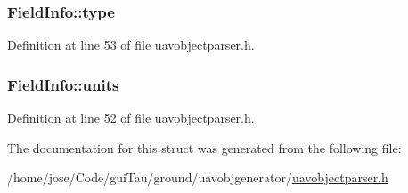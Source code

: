 \hypertarget{struct_field_info_a4bdab922a850f6d0f19057252fd2e71e}{
\subsubsection[{type}]{ Field\-Info\-::type}}\label{struct_field_info_a4bdab922a850f6d0f19057252fd2e71e}


Definition at line 53 of file uavobjectparser.\-h.

\hypertarget{struct_field_info_affe71f2ec30acaab0ae16d17f0c7d2a4}{
\subsubsection[{units}]{ Field\-Info\-::units}}\label{struct_field_info_affe71f2ec30acaab0ae16d17f0c7d2a4}


Definition at line 52 of file uavobjectparser.\-h.



The documentation for this struct was generated from the following file\-:\begin{DoxyCompactItemize}
\item 
/home/jose/\-Code/gui\-Tau/ground/uavobjgenerator/\hyperlink{uavobjectparser_8h}{uavobjectparser.\-h}\end{DoxyCompactItemize}
